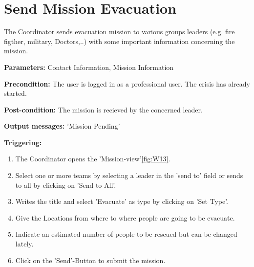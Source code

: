 \section{Send Mission Evacuation}
\label{operation:Evacuate}
The Coordinator sends evacuation mission to various groups leaders (e.g. fire
figther, military, Doctors,..) with some important information concerning the
mission.\\
\begin{description}
\item \textbf{Parameters:} Contact Information, Mission Information
\item \textbf{Precondition:} The user is logged in as a professional user. The
crisis has already started.  
\item \textbf{Post-condition:} The mission is recieved by the concerned leader.
\item \textbf{Output messages:} 'Mission Pending'
\item \textbf{Triggering:}
\begin{enumerate}
\item The Coordinator opens the 'Mission-view'\ref{fig:W13}.
\item Select one or more teams by selecting a leader in the 'send to' field or
sends to all by clicking on 'Send to All'.
\item Writes the title and select 'Evacuate' as type by clicking on 'Set
Type'.
\item Give the Locations from where to where people are going to be evacuate.
\item Indicate an estimated number of people to be rescued but can be changed
lately.
\item Click on the 'Send'-Button to submit the mission.
\end{enumerate}
\end{description}

